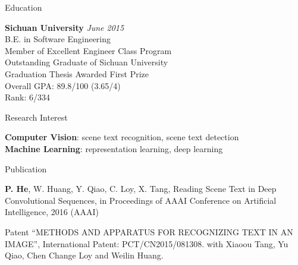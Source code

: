 \documentclass{resume} %
\begin{document}

\begin{rSection}{Education}

{\bf Sichuan University} \hfill {\em June 2015} \\ 
B.E. in Software Engineering \\
Member of Excellent Engineer Class Program\\
Outstanding Graduate of Sichuan University \\
Graduation Thesis Awarded First Prize \\
Overall GPA: 89.8/100 (3.65/4) \\
Rank: 6/334 \\


\end{rSection}


\begin{rSection}{Research Interest}

\textbf{Computer Vision}: scene text recognition, scene text detection \\
\textbf{Machine Learning}: representation learning, deep learning

\end{rSection}



\begin{rSection}{Publication}

\textbf{P. He}, W. Huang, Y. Qiao, C. Loy, X. Tang, Reading Scene Text in Deep Convolutional Sequences, in Proceedings of AAAI Conference on Artificial Intelligence, 2016 (AAAI)
\end{rSection}


\begin{rSection}{Patent}
``METHODS AND APPARATUS FOR RECOGNIZING TEXT IN AN IMAGE'', International Patent: PCT/CN2015/081308.
with Xiaoou Tang, Yu Qiao, Chen Change Loy and Weilin Huang.
\end{rSection}
\end{document}
